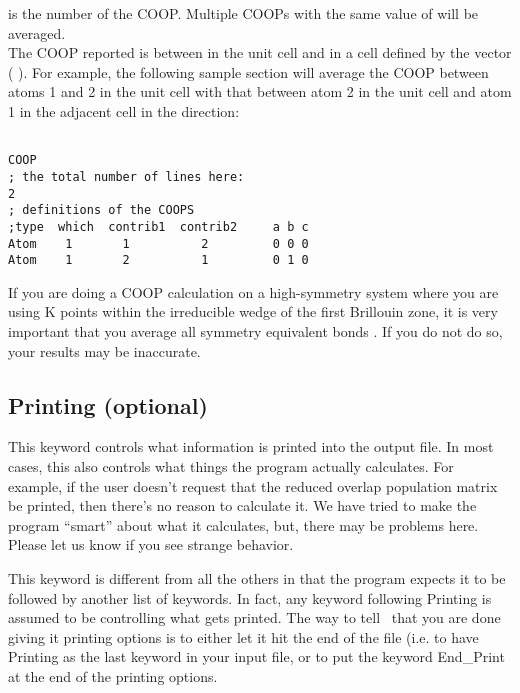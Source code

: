 \noindent {} is the number of the COOP.  Multiple COOPs with the same
value of  will be averaged. \\

The COOP reported is between  in the unit cell and
 in a cell defined by the vector ( 
).  For example, the following sample section will average 
the COOP between atoms 1 and 2 in the unit cell with that between atom
2 in the unit cell and atom 1 in the adjacent cell in the 
direction:

\shrinkspacing
\begin{verbatim}

COOP
; the total number of lines here:
2
; definitions of the COOPS
;type  which  contrib1  contrib2     a b c
Atom    1       1          2         0 0 0
Atom    1       2          1         0 1 0

\end{verbatim}
\resumespacing

  If you are doing a COOP calculation on a high-symmetry
system where you are using K points within the irreducible wedge of
the first Brillouin zone, it is very important that you average all
symmetry equivalent bonds \cite{thesis}.
If you do not do so, your results may be inaccurate.

\subsection{{\sf Printing} (optional)}

This keyword controls what information is printed into the output
file.  In most cases, this also controls what things the program
actually calculates.  For example, if the user doesn't request that
the reduced overlap population matrix be printed, then there's no
reason to calculate it.  We have tried to make the program
``smart'' about what it calculates, but, there
may be problems here.  Please let us know if you see strange behavior.

This keyword is different from all the others in that the program
expects it to be followed by another list of keywords.  In fact, any
keyword following {\sf Printing} is assumed to be controlling what
gets printed.  The way to tell \calcprog\ that you are done giving it
printing options is to either let it hit the end of the file (i.e. to
have {\sf Printing} as the last keyword in your input file, or to put
the keyword {\sf End\_Print} at the end of the printing options. \\

